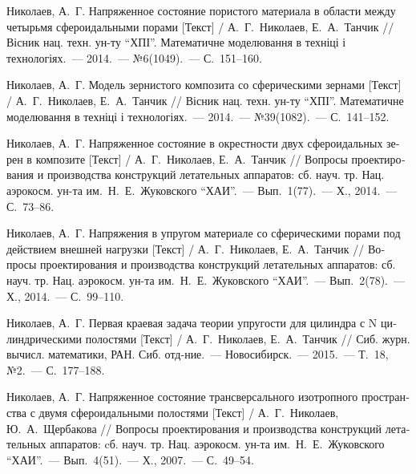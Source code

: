 \begin{russian}
\begin{biblist}{99}
Николаев, А.~Г. 
Напряженное состояние пористого материала в области между четырьмя сфероидальными порами [Текст] 
/ А.~Г.~Николаев, Е.~А.~Танчик 
// Вісник нац. техн. ун-ту ``ХПІ''. Математичне моделювання в техніці і технологіях.~--- 2014.~--- №6(1049).~--- С.~151--160.

Николаев, А.~Г. 
Модель зернистого композита со сферическими зернами [Текст] 
/ А.~Г.~Николаев, Е.~А.~Танчик 
// Вісник нац. техн. ун-ту ``ХПІ''. Математичне моделювання в техніці і технологіях.~--- 2014.~--- №39(1082).~--- С.~141--152.

Николаев, А.~Г. 
Напряженное состояние в окрестности двух сфероидальных зерен в композите [Текст] 
/ А.~Г.~Николаев, Е.~А.~Танчик 
// Вопросы проектирования и производства конструкций летательных аппаратов: сб. науч. тр. Нац. аэрокосм. ун-та им.~Н.~Е.~Жуковского ``ХАИ''.~--- Вып.~1(77).~--- Х., 2014.~--- С.~73--86.

Николаев, А.~Г. 
Напряжения в упругом материале со сферическими порами под действием внешней нагрузки [Текст] 
/ А.~Г.~Николаев, Е.~А.~Танчик 
// Вопросы проектирования и производства конструкций летательных аппаратов: сб. науч. тр. Нац. аэрокосм. ун-та им.~Н.~Е.~Жуковского ``ХАИ''.~--- Вып.~2(78).~--- Х., 2014.~--- С.~99--110.

Николаев, А.~Г. 
Первая краевая задача теории упругости для цилиндра с N цилиндрическими полостями [Текст] 
/ А.~Г.~Николаев, Е.~А.~Танчик 
// Сиб. журн. вычисл. математики, РАН. Сиб. отд-ние.~--- Новосибирск.~--- 2015.~--- Т.~18, №2.~--- С.~177--188.

Николаев, А.~Г. 
Напряженное состояние  трансверсального изотропного пространства с двумя сфероидальными полостями [Текст] 
/ А.~Г.~Николаев, Ю.~А.~Щербакова 
// Вопросы проектирования и производства конструкций летательных аппаратов: cб. науч. тр. Нац. аэрокосм. ун-та им.~Н.~Е.~Жуковского ``ХАИ''.~--- Вып.~4(51).~--- Х., 2007.~--- С.~49--54.




\end{biblist}
\end{russian}

